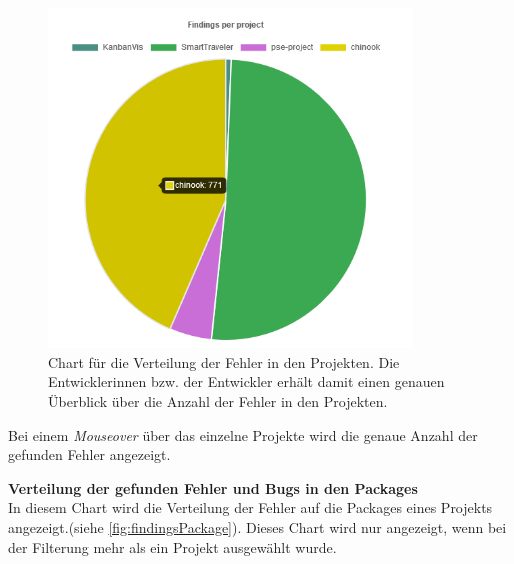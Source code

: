 \begin{figure}[tp]
  \centering
  \includegraphics[height=9cm]{images/findingsPerProject.PNG}
 \caption[Chart für die Verteilung der Fehler in den Projekten. Die Entwicklerinnen bzw. der Entwickler erhält damit einen genauen Überblick über die Anzahl der Fehler in den Projekten.]{Chart für die Verteilung der Fehler in den Projekten. Die Entwicklerinnen bzw. der Entwickler erhält damit einen genauen Überblick über die Anzahl der Fehler in den Projekten.}
  \label{fig:findingsProject}
\end{figure}

Bei einem \textit{Mouseover} über das einzelne Projekte wird die genaue Anzahl der gefunden Fehler angezeigt.

\textbf{Verteilung der gefunden Fehler und Bugs in den Packages} \\
In diesem Chart wird die Verteilung der Fehler auf die Packages eines Projekts angezeigt.(siehe \ref{fig:findingsPackage}). Dieses Chart wird nur angezeigt, wenn bei der Filterung mehr als ein Projekt ausgewählt wurde.

